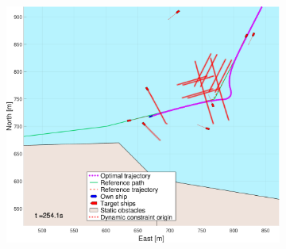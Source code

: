\begin{figure}[!ht]
\begin{subfigure}[b]{0.494\textwidth}
        \subcaption{}
    \end{subfigure}
    \hfill
    \begin{subfigure}[b]{0.494\textwidth}
        \centering
        \includegraphics[width=\textwidth]{Images/NewFigures/Trheimfjord/_Simple_0fig999_time=255}
        \subcaption{}
    \end{subfigure}
    \hfill
    \label{FIG: Fjord with prediction}
\end{figure}%
